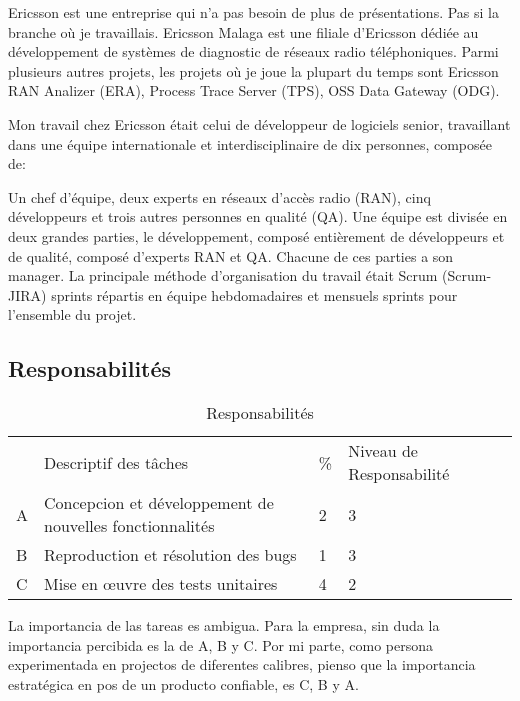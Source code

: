 \documentclass{resume} %
\begin{document}
Ericsson est une entreprise qui n'a pas besoin de plus de présentations. Pas si la branche où je travaillais.
Ericsson Malaga est une filiale d'Ericsson dédiée au développement de systèmes de diagnostic de réseaux radio téléphoniques.
Parmi plusieurs autres projets, les projets où je joue la plupart du temps sont Ericsson RAN \footnotemark Analizer  (ERA), Process Trace Server (TPS), OSS Data Gateway (ODG). 


Mon travail chez Ericsson était celui de développeur de logiciels senior, travaillant dans une équipe internationale et interdisciplinaire de dix personnes, composée de:

Un chef d'équipe, deux experts en réseaux d'accès radio (RAN), cinq développeurs et trois autres personnes en qualité (QA).
Une équipe est divisée en deux grandes parties, le développement, composé entièrement de développeurs et de qualité, composé d'experts RAN et QA. Chacune de ces parties a son manager.
La principale méthode d'organisation du travail était Scrum (Scrum-JIRA) sprints répartis en équipe hebdomadaires et mensuels sprints pour l'ensemble du projet.


\subsection{Responsabilités}
	
	
\begin{table}[!htbp]
\label{my-label}
\begin{tabular}{|l|l|l|l|l}
\cline{1-4}
   & Descriptif des tâches &  \% & Niveau de Responsabilité \footnotemark  &  \\ \cline{1-4}  
A & Concepcion et développement de nouvelles fonctionnalités & 2 & 3 & \\ \cline {1-4}
B & Reproduction et résolution des bugs & 1 & 3 & \\ \cline {1-4}
C & Mise en œuvre des tests unitaires & 4 & 2 & \\ \cline {1-4}
\end{tabular}
\caption{Responsabilités}
\end{table}

La importancia de las tareas es ambigua. Para la empresa, sin duda la importancia percibida es la de A, B y C. Por mi parte, como persona experimentada en projectos de diferentes calibres, pienso que la importancia estratégica en pos de un producto confiable, es C, B y A.
 
\end{document}
